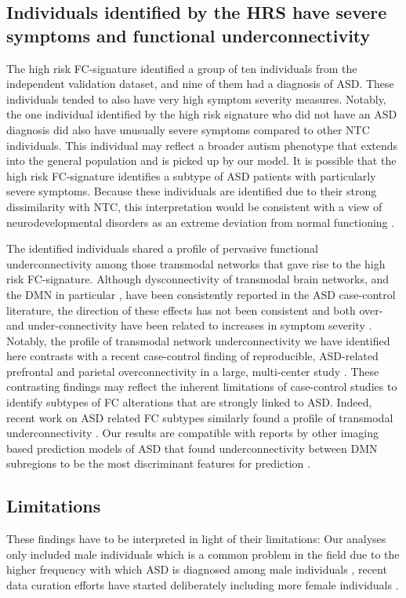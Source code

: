 \documentclass[9pt,lineno]{elife}
\begin{document}
\subsection{Individuals identified by the HRS have severe symptoms and functional underconnectivity}
The high risk FC-signature identified a group of ten individuals from the independent validation dataset, and nine of them had a diagnosis of ASD. These individuals tended to also have very high symptom severity measures. Notably, the one individual identified by the high risk signature who did not have an ASD diagnosis did also have unusually severe symptoms compared to other NTC individuals. This individual may reflect a broader autism phenotype that extends into the general population \citep{Baron-Cohen2001-fx} and is picked up by our model. It is possible that the high risk FC-signature identifies a subtype of ASD patients with particularly severe symptoms. Because these individuals are identified due to their strong dissimilarity with NTC, this interpretation would be consistent with a view of neurodevelopmental disorders as an extreme deviation from normal functioning \citep{Marquand2019-ip}.

The identified individuals shared a profile of pervasive functional underconnectivity among those transmodal networks that gave rise to the high risk FC-signature. Although dysconnectivity of transmodal brain networks, and the DMN in particular \citep{Monk2009-go}, have been consistently reported in the ASD case-control literature, the direction of these effects has not been consistent \citep{Padmanabhan2017-an,Hull2016-iu} and both over- and under-connectivity have been related to increases in symptom severity \citep{Assaf2010-jx,Supekar2013-lh}. Notably, the profile of transmodal network underconnectivity we have identified here contrasts with a recent case-control finding of reproducible, ASD-related prefrontal and parietal overconnectivity in a large, multi-center study \citep{Holiga2019-ub}. These contrasting findings may reflect the inherent limitations of case-control studies to identify subtypes of FC alterations that are strongly linked to ASD. Indeed, recent work on ASD related FC subtypes similarly found a profile of transmodal underconnectivity \citep{Tang2019-ww}. Our results are compatible with reports by other imaging based prediction models of ASD that found underconnectivity between DMN subregions to be the most discriminant features for prediction \citep{Abraham2017-vf,Heinsfeld2018-yl,Yahata2016-jk}.

\subsection{Limitations}
These findings have to be interpreted in light of their limitations: Our analyses only included male individuals which is a common problem in the field \citep{Khundrakpam2017-hq,Hong2019-hp} due to the higher frequency with which ASD is diagnosed among male individuals \citep{Lai2014-tf}, recent data curation efforts have started deliberately including more female individuals \citep{Di_Martino2017-md,Bedford2019-sz}. 
\end{document}
